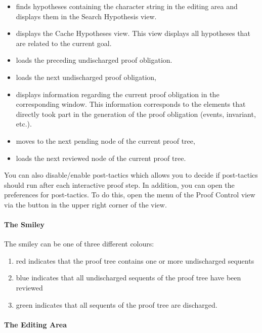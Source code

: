 \begin{itemize}
    \item {} finds hypotheses containing the character string in the editing area and displays them in the Search Hypothesis view.
    \item {} displays the \textsf{Cache Hypotheses} view. This view displays all hypotheses that are related to the current goal.
    \item {} loads the preceding undischarged proof obligation.
    \item {} loads the next undischarged proof obligation,
    \item {} displays information regarding the current proof obligation in the corresponding window. This information corresponds to the elements that directly took part in the generation of the proof obligation (events, invariant, etc.).
    \item {} moves to the next pending node of the current proof tree,
    \item {} loads the next reviewed node of the current proof tree.
\end{itemize}

You can also disable/enable post-tactics which allows you to decide if post-tactics should run after each interactive proof step. In addition, you can open the preferences for post-tactics. To do this, open the menu of the \textsf{Proof Control} view via the  button in the upper right corner of the view.

\paragraph{The Smiley}

The smiley can be one of three different colours: 

\begin{enumerate}
	\item red indicates that the proof tree contains one or more undischarged sequents
	\item blue indicates that all undischarged sequents of the proof tree have been reviewed
	\item green indicates that all sequents of the proof tree are discharged.
\end{enumerate}

\paragraph{The Editing Area}

